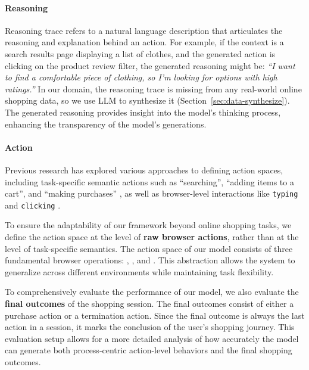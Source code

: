\documentclass[11pt]{article}
\begin{document}
\paragraph{Reasoning}

Reasoning trace refers to a natural language description that articulates the reasoning and explanation behind an action.
For example, if the context is a search results page displaying a list of clothes, and the generated action is clicking on the  product review filter, the generated reasoning might be: \textit{``I want to find a comfortable piece of clothing, so I’m looking for options with high ratings.''}
In our domain, the reasoning trace is missing from any real-world online shopping data, so we use LLM to synthesize it (Section~\ref{sec:data-synthesize}).
The generated reasoning provides insight into the model's thinking process, enhancing the transparency of the model's generations.

\paragraph{Action}
Previous research has explored various approaches to defining action spaces, including task-specific semantic actions such as ``searching'', ``adding items to a cart'', and ``making purchases'' \cite{yaoWebShopScalableRealWorld2022}, as well as browser-level interactions like \texttt{typing} and \texttt{clicking} \cite{luUXAgentLLMAgentBased2025}. 

To ensure the adaptability of our framework beyond online shopping tasks, we define the action space at the level of \textbf{raw browser actions}, rather than at the level of task-specific semantics.
The action space of our model consists of three fundamental browser operations: , , and .
This abstraction allows the system to generalize across different environments while maintaining task flexibility.
\label{sec:action-definition}

To comprehensively evaluate the performance of our model, we also evaluate the \textbf{final outcomes} of the shopping session.
The final outcomes consist of either a purchase action or a termination action.
Since the final outcome is always the last action in a session, it marks the conclusion of the user’s shopping journey.
This evaluation setup allows for a more detailed analysis of how accurately the model can generate both process-centric action-level behaviors and the final shopping outcomes.
\end{document}
